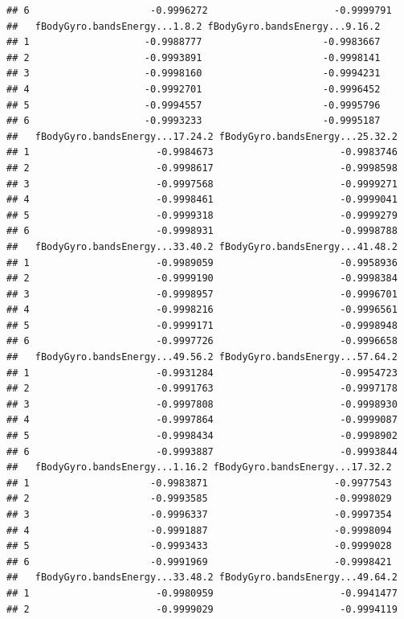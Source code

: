\documentclass[
]{article}
\begin{document}
\begin{verbatim}
## 6                     -0.9996272                      -0.9999791
##   fBodyGyro.bandsEnergy...1.8.2 fBodyGyro.bandsEnergy...9.16.2
## 1                    -0.9988777                     -0.9983667
## 2                    -0.9993891                     -0.9998141
## 3                    -0.9998160                     -0.9994231
## 4                    -0.9992701                     -0.9996452
## 5                    -0.9994557                     -0.9995796
## 6                    -0.9993233                     -0.9995187
##   fBodyGyro.bandsEnergy...17.24.2 fBodyGyro.bandsEnergy...25.32.2
## 1                      -0.9984673                      -0.9983746
## 2                      -0.9998617                      -0.9998598
## 3                      -0.9997568                      -0.9999271
## 4                      -0.9998461                      -0.9999041
## 5                      -0.9999318                      -0.9999279
## 6                      -0.9998931                      -0.9998788
##   fBodyGyro.bandsEnergy...33.40.2 fBodyGyro.bandsEnergy...41.48.2
## 1                      -0.9989059                      -0.9958936
## 2                      -0.9999190                      -0.9998384
## 3                      -0.9998957                      -0.9996701
## 4                      -0.9998216                      -0.9996561
## 5                      -0.9999171                      -0.9998948
## 6                      -0.9997726                      -0.9996658
##   fBodyGyro.bandsEnergy...49.56.2 fBodyGyro.bandsEnergy...57.64.2
## 1                      -0.9931284                      -0.9954723
## 2                      -0.9991763                      -0.9997178
## 3                      -0.9997808                      -0.9998930
## 4                      -0.9997864                      -0.9999087
## 5                      -0.9998434                      -0.9998902
## 6                      -0.9993887                      -0.9993844
##   fBodyGyro.bandsEnergy...1.16.2 fBodyGyro.bandsEnergy...17.32.2
## 1                     -0.9983871                      -0.9977543
## 2                     -0.9993585                      -0.9998029
## 3                     -0.9996337                      -0.9997354
## 4                     -0.9991887                      -0.9998094
## 5                     -0.9993433                      -0.9999028
## 6                     -0.9991969                      -0.9998421
##   fBodyGyro.bandsEnergy...33.48.2 fBodyGyro.bandsEnergy...49.64.2
## 1                      -0.9980959                      -0.9941477
## 2                      -0.9999029                      -0.9994119

\end{verbatim}
\end{document}
